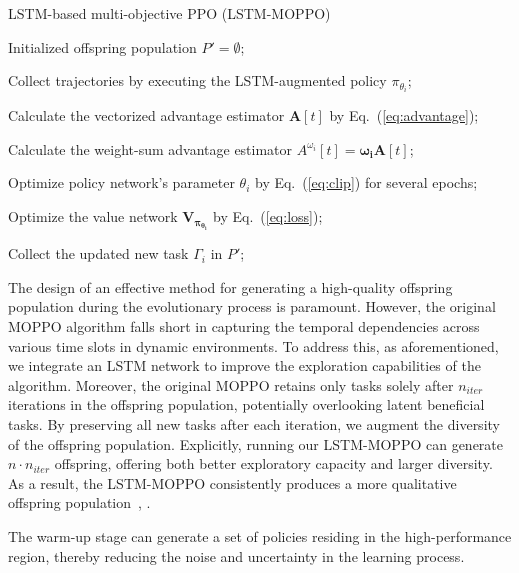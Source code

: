 \documentclass[10pt,journal,compsoc]{IEEEtran}
\begin{document}
\begin{algorithm}[t]
    \caption{LSTM-based multi-objective PPO (LSTM-MOPPO)}
    \label{alg:lstm-ppo}

    Initialized offspring population $P' = \emptyset$;
    
     {
         {
            Collect trajectories by executing the LSTM-augmented policy $\pi_{\theta_i}$;
            
            Calculate the vectorized advantage estimator $\boldsymbol{A}[t]$ by Eq.~(\ref{eq:advantage});

            Calculate the weight-sum advantage estimator $A^{\omega_i}[t] = \boldsymbol{\omega_i A}[t]$;

            Optimize policy network's parameter $\theta_i$ by Eq.~(\ref{eq:clip}) for several epochs;

            Optimize the value network $\boldsymbol{V_{\pi_{\theta_i}}}$ by Eq.~(\ref{eq:loss});

            Collect the updated new task $\Gamma_i$ in $P'$;
        }
    }
\end{algorithm}

\par The design of an effective method for generating a high-quality offspring population during the evolutionary process is paramount. However, the original MOPPO algorithm falls short in capturing the temporal dependencies across various time slots in dynamic environments. To address this, as aforementioned, we integrate an LSTM network to improve the exploration capabilities of the algorithm. Moreover, the original MOPPO retains only tasks solely after $n_{iter}$ iterations in the offspring population, potentially overlooking latent beneficial tasks. By preserving all new tasks after each iteration, we augment the diversity of the offspring population. Explicitly, running our LSTM-MOPPO can generate $n \cdot n_{iter}$ offspring, offering both better exploratory capacity and larger diversity. As a result, the LSTM-MOPPO consistently produces a more qualitative offspring population~\cite{song2022evolutionary}, \cite{Ferdowsi2021neural}.

\par The warm-up stage can generate a set of policies residing in the high-performance region, thereby reducing the noise and uncertainty in the learning process.
\end{document}

